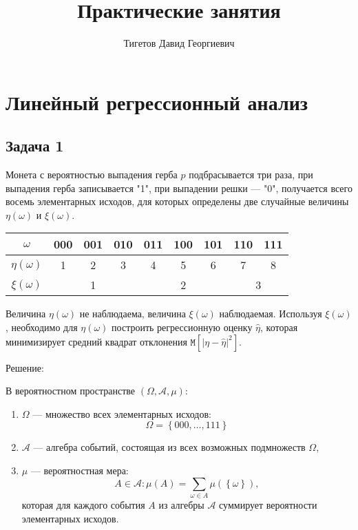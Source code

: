 \documentclass[a4paper,12pt]{article}
\newcommand{\solution}{Решение:\par}
\newcommand{\expectation}[1]{\texttt{M} \left[ #1 \right]}
\newcommand{\modulus}[1]{\left | #1 \right |}
\newcommand{\set}[1]{\left \{ #1 \right \}}
\begin{document}
\title{Практические занятия}
\author{Тигетов Давид Георгиевич}
\maketitle

\setcounter{section}{5}

\section{Линейный регрессионный анализ}

\subsection*{Задача 1}

Монета с вероятностью выпадения герба $p$ подбрасывается три раза, при выпадения герба записывается "1", при выпадении решки --- "0", получается всего
восемь элементарных исходов, для которых определены две случайные величины $\eta(\omega)$ и $\xi(\omega)$.

\begin{center}
    \begin{tabular}{|c|c|c|c|c|c|c|c|c|}
        \hline
        $\omega$       & 000                     & 001                     & 010                     & 011 & 100 & 101 & 110 & 111 \\
        \hline
        $\eta(\omega)$ & 1                       & 2                       & 3                       & 4   & 5   & 6   & 7   & 8   \\
        \hline
        $\xi(\omega)$  & \multicolumn{3}{|c|}{1} & \multicolumn{3}{|c|}{2} & \multicolumn{2}{|c|}{3}                               \\
        \hline
    \end{tabular}
\end{center}

Величина $\eta(\omega)$ не наблюдаема, величина $\xi(\omega)$ наблюдаемая. Используя $\xi(\omega)$, необходимо для $\eta(\omega)$ построить
регрессионную оценку $\widehat{\eta}$, которая минимизирует средний квадрат отклонения $\expectation{\modulus{\eta - \widehat{\eta}}^2}$.

\solution

В вероятностном пространстве $(\Omega, \mathcal{A}, \mu)$:
\begin{enumerate}
    \item $\Omega$ --- множество всех элементарных исходов:
          \[
              \Omega = \set{000, \dots, 111}
          \]

    \item $\mathcal{A}$ --- алгебра событий, состоящая из всех возможных подмножеств $\Omega$,
    \item $\mu$ --- вероятностная мера:
          \[
              A \in \mathcal{A}: \mu \left(A \right) = \sum_{\omega \in A} \mu \left( \set{\omega} \right) ,
          \]
          которая для каждого события $A$ из алгебры $\mathcal{A}$ суммирует вероятности элементарных исходов.
\end{enumerate}
\end{document}
